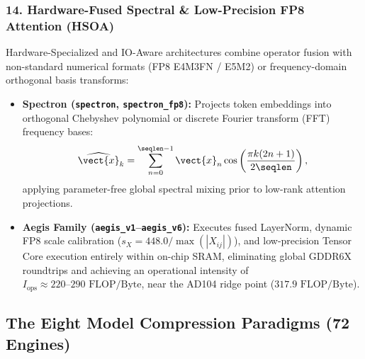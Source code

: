 \subsubsection{14. Hardware-Fused Spectral \& Low-Precision FP8 Attention (HSOA)}
\label{subsubsec:hsoa_contract}
Hardware-Specialized and IO-Aware architectures combine operator fusion with non-standard numerical formats (FP8 E4M3FN / E5M2) or frequency-domain orthogonal basis transforms:
\begin{itemize}
\item \textbf{Spectron (\texttt{spectron}, \texttt{spectron\_fp8}):} Projects token embeddings into orthogonal Chebyshev polynomial or discrete Fourier transform (FFT) frequency bases:
\begin{equation}
\widehat{\vect{x}}_k = \sum_{n=0}^{\seqlen-1} \vect{x}_n \cos\left( \frac{\pi k (2n + 1)}{2\seqlen} \right),
\end{equation}
applying parameter-free global spectral mixing prior to low-rank attention projections.
\item \textbf{Aegis Family (\texttt{aegis\_v1}--\texttt{aegis\_v6}):} Executes fused LayerNorm, dynamic FP8 scale calibration ($s_X = 448.0 / \max(|X_{ij}|)$), and low-precision Tensor Core execution entirely within on-chip SRAM, eliminating global GDDR6X roundtrips and achieving an operational intensity of $I_{\text{ops}} \approx 220\text{--}290\text{ FLOP/Byte}$, near the AD104 ridge point ($317.9\text{ FLOP/Byte}$).
\end{itemize}

\subsection{The Eight Model Compression Paradigms (72 Engines)}
\label{subsec:compression_taxonomy}

